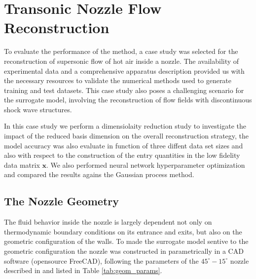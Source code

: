 \chapter{Transonic Nozzle Flow Reconstruction}
\label{chap:Case_Study}

To evaluate the performance of the method, a case study was selected for the reconstruction of supersonic flow of hot air inside a nozzle. The availability of experimental data and a comprehensive apparatus description \citep{Back1965a} provided us with the necessary resources to validate the numerical methods used to generate training and test datasets. This case study also poses a challenging scenario for the surrogate model, involving the reconstruction of flow fields with discontinuous shock wave structures.

In this case study we perform a dimensiolaity reduction study to investigate the impact of the reduced basis dimension on the overall reconstruction strategy, the model accuracy was also evaluate in function of three diffent data set sizes and also with respect to the construction of the entry quantities in the low fidelity data matrix $\mathbf{x}$. We also performed neural network hyperparameter optimization and compared the results agains the Gaussian process method.

\section{The Nozzle Geometry}

The fluid behavior inside the nozzle is largely dependent not only on thermodynamic boundary conditions on its entrance and exits, but also on the geometric configuration of the walls. To made the surrogate model sentive to the geometric configuration the nozzle was constructed in parametrically in a CAD software (opensource FreeCAD), following the parameters of the $45^\circ-15^\circ$ nozzle described in \cite{Back1965a} and listed in Table \ref{tab:geom_params}.

